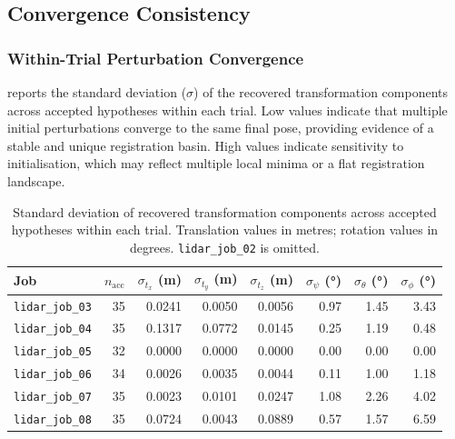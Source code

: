 \subsection{Convergence Consistency}
\label{subsec:pa-results-convergence}

\subsubsection*{Within-Trial Perturbation Convergence}

 reports the standard deviation ($\sigma$) of the recovered transformation components across accepted hypotheses within each trial. Low values indicate that multiple initial perturbations converge to the same final pose, providing evidence of a stable and unique registration basin. High values indicate sensitivity to initialisation, which may reflect multiple local minima or a flat registration landscape.

\begin{table}[htbp]
  \centering
  \caption{Standard deviation of recovered transformation components across accepted hypotheses within each trial. Translation values in metres; rotation values in degrees. \texttt{lidar\_job\_02} is omitted.}
  \label{tab:pa-results-within-job-sigma}
  \begin{tabularx}{\textwidth}{l r r r r r r r}
    \toprule
    \textbf{Job} &
    \boldmath$n_\text{acc}$ &
    \boldmath$\sigma_{t_x}$ \textbf{(m)} &
    \boldmath$\sigma_{t_y}$ \textbf{(m)} &
    \boldmath$\sigma_{t_z}$ \textbf{(m)} &
    \boldmath$\sigma_{\psi}$ \textbf{(°)} &
    \boldmath$\sigma_{\theta}$ \textbf{(°)} &
    \boldmath$\sigma_{\phi}$ \textbf{(°)} \\
    \midrule
    \texttt{lidar\_job\_03} & 35 & 0.0241 & 0.0050 & 0.0056 & 0.97 & 1.45 & 3.43 \\
    \texttt{lidar\_job\_04} & 35 & 0.1317 & 0.0772 & 0.0145 & 0.25 & 1.19 & 0.48 \\
    \texttt{lidar\_job\_05} & 32 & 0.0000 & 0.0000 & 0.0000 & 0.00 & 0.00 & 0.00 \\
    \texttt{lidar\_job\_06} & 34 & 0.0026 & 0.0035 & 0.0044 & 0.11 & 1.00 & 1.18 \\
    \texttt{lidar\_job\_07} & 35 & 0.0023 & 0.0101 & 0.0247 & 1.08 & 2.26 & 4.02 \\
    \texttt{lidar\_job\_08} & 35 & 0.0724 & 0.0043 & 0.0889 & 0.57 & 1.57 & 6.59 \\
    \bottomrule
  \end{tabularx}
\end{table}

